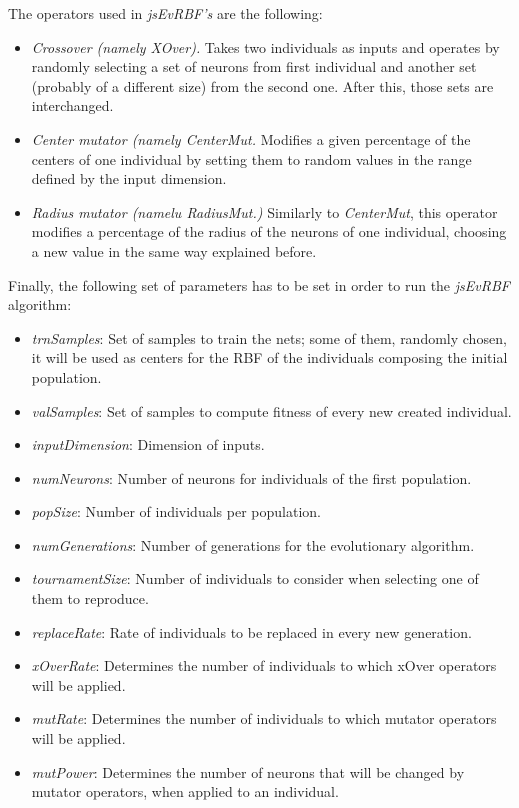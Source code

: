 \documentclass{article}
\begin{document}
The operators used in {\em jsEvRBF's} are the following:

\begin{itemize}
\item {\em Crossover (namely XOver).} Takes two individuals as inputs and operates by randomly selecting a set of neurons from first individual and another set (probably of a different size) from the second one. After this, those sets are interchanged.
\item {\em Center mutator (namely CenterMut.} Modifies a given percentage of the centers of one individual by setting them to random values in the range defined by the input dimension.
\item {\em Radius mutator (namelu RadiusMut.)} Similarly to \emph{CenterMut}, this operator modifies a percentage of the radius of the neurons of one individual, choosing a new value in the same way explained before.
\end{itemize}


Finally, the following set of parameters has to be set in
order to run the {\em jsEvRBF} algorithm: %
\begin{itemize}
\item{\em trnSamples}: Set of samples to train the nets; some of them, randomly chosen, it will be used as centers for the RBF of the individuals composing the initial population.
\item{\em valSamples}: Set of samples to compute fitness of every new created individual.
\item{\em inputDimension}: Dimension of inputs.
\item{\em numNeurons}: Number of neurons for individuals of the first population.
\item{\em popSize}: Number of individuals per population.
\item{\em numGenerations}: Number of generations for the evolutionary algorithm.
\item{\em tournamentSize}: Number of individuals to consider when selecting one of them to reproduce.
\item{\em replaceRate}: Rate of individuals to be replaced in every new generation.
\item{\em xOverRate}: Determines the number of individuals to which xOver operators will be applied.
\item{\em mutRate}: Determines the number of individuals to which mutator operators will be applied.
\item{\em mutPower}: Determines the number of neurons that will be changed by mutator operators, when applied to an individual.
\end{itemize}
\end{document}
